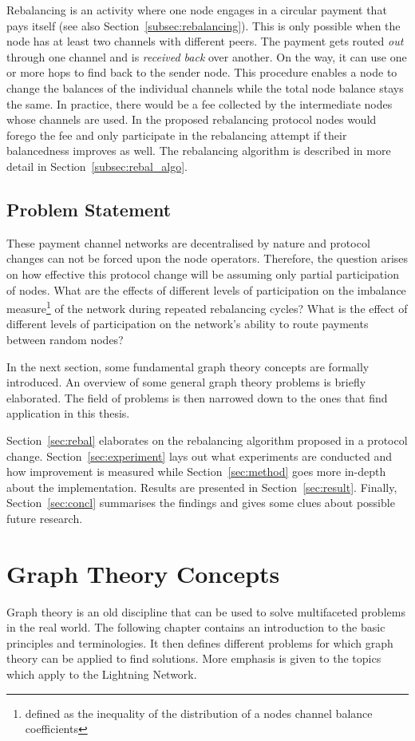 \documentclass[final]{fhnwreport}       %
\begin{document}
Rebalancing is an activity where one node engages in a circular payment that pays itself (see also Section~\ref{subsec:rebalancing}). This is only possible when the node has at least two channels with different peers. The payment gets routed \emph{out} through one channel and is \emph{received back} over another. On the way, it can use one or more hops to find back to the sender node. This procedure enables a node to change the balances of the individual channels while the total node balance stays the same. In practice, there would be a fee collected by the intermediate nodes whose channels are used. In the proposed rebalancing protocol nodes would forego the fee and only participate in the rebalancing attempt if their balancedness improves as well. The rebalancing algorithm is described in more detail in Section~\ref{subsec:rebal_algo}. 


\subsection{Problem Statement}
These payment channel networks are decentralised by nature and protocol changes can not be forced upon the node operators. Therefore, the question arises on how effective this protocol change will be assuming only partial participation of nodes. What are the effects of different levels of participation on the imbalance measure\footnote{defined as the inequality of the distribution of a nodes channel balance coefficients} of the network during repeated rebalancing cycles? What is the effect of different levels of participation on the network's ability to route payments between random nodes? 

In the next section, some fundamental graph theory concepts are formally introduced. An overview of some general graph theory problems is briefly elaborated. The field of problems is then narrowed down to the ones that find application in this thesis.

Section~\ref{sec:rebal} elaborates on the rebalancing algorithm proposed in a protocol change. Section~\ref{sec:experiment} lays out what experiments are conducted and how improvement is measured while Section~\ref{sec:method} goes more in-depth about the implementation. Results are presented in Section~\ref{sec:result}. Finally, Section~\ref{sec:concl} summarises the findings and gives some clues about possible future research.

\newpage
\section{Graph Theory Concepts}\label{sec:graph}
Graph theory is an old discipline that can be used to solve multifaceted problems in the real world. The following chapter contains an introduction to the basic principles and terminologies. It then defines different problems for which graph theory can be applied to find solutions. More emphasis is given to the topics which apply to the Lightning Network.
\end{document}
